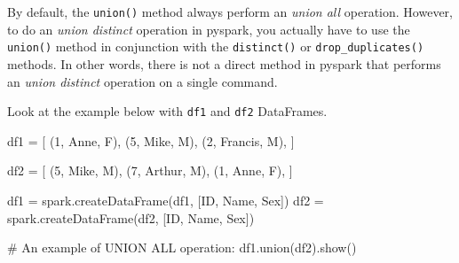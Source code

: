 \documentclass[
  11pt,
  letterpaper,
  DIV=11,
  numbers=noendperiod]{scrreprt}
\newenvironment{Shaded}{\begin{snugshade}}{\end{snugshade}}
\newcommand{\CommentTok}[1]{\textcolor[rgb]{0.37,0.37,0.37}{#1}}
\newcommand{\DecValTok}[1]{\textcolor[rgb]{0.68,0.00,0.00}{#1}}
\newcommand{\NormalTok}[1]{\textcolor[rgb]{0.00,0.23,0.31}{#1}}
\newcommand{\OperatorTok}[1]{\textcolor[rgb]{0.37,0.37,0.37}{#1}}
\newcommand{\StringTok}[1]{\textcolor[rgb]{0.13,0.47,0.30}{#1}}
\begin{document}
By default, the \texttt{union()} method always perform an \emph{union
all} operation. However, to do an \emph{union distinct} operation in
pyspark, you actually have to use the \texttt{union()} method in
conjunction with the \texttt{distinct()} or \texttt{drop\_duplicates()}
methods. In other words, there is not a direct method in pyspark that
performs an \emph{union distinct} operation on a single command.

Look at the example below with \texttt{df1} and \texttt{df2} DataFrames.

\begin{Shaded}
\begin{Highlighting}[]
\NormalTok{df1 }\OperatorTok{=}\NormalTok{ [}
\NormalTok{    (}\DecValTok{1}\NormalTok{, }\StringTok{\textquotesingle{}Anne\textquotesingle{}}\NormalTok{, }\StringTok{\textquotesingle{}F\textquotesingle{}}\NormalTok{),}
\NormalTok{    (}\DecValTok{5}\NormalTok{, }\StringTok{\textquotesingle{}Mike\textquotesingle{}}\NormalTok{, }\StringTok{\textquotesingle{}M\textquotesingle{}}\NormalTok{),}
\NormalTok{    (}\DecValTok{2}\NormalTok{, }\StringTok{\textquotesingle{}Francis\textquotesingle{}}\NormalTok{, }\StringTok{\textquotesingle{}M\textquotesingle{}}\NormalTok{),}
\NormalTok{]}

\NormalTok{df2 }\OperatorTok{=}\NormalTok{ [}
\NormalTok{    (}\DecValTok{5}\NormalTok{, }\StringTok{\textquotesingle{}Mike\textquotesingle{}}\NormalTok{, }\StringTok{\textquotesingle{}M\textquotesingle{}}\NormalTok{),}
\NormalTok{    (}\DecValTok{7}\NormalTok{, }\StringTok{\textquotesingle{}Arthur\textquotesingle{}}\NormalTok{, }\StringTok{\textquotesingle{}M\textquotesingle{}}\NormalTok{),}
\NormalTok{    (}\DecValTok{1}\NormalTok{, }\StringTok{\textquotesingle{}Anne\textquotesingle{}}\NormalTok{, }\StringTok{\textquotesingle{}F\textquotesingle{}}\NormalTok{),}
\NormalTok{]}

\NormalTok{df1 }\OperatorTok{=}\NormalTok{ spark.createDataFrame(df1, [}\StringTok{\textquotesingle{}ID\textquotesingle{}}\NormalTok{, }\StringTok{\textquotesingle{}Name\textquotesingle{}}\NormalTok{, }\StringTok{\textquotesingle{}Sex\textquotesingle{}}\NormalTok{])}
\NormalTok{df2 }\OperatorTok{=}\NormalTok{ spark.createDataFrame(df2, [}\StringTok{\textquotesingle{}ID\textquotesingle{}}\NormalTok{, }\StringTok{\textquotesingle{}Name\textquotesingle{}}\NormalTok{, }\StringTok{\textquotesingle{}Sex\textquotesingle{}}\NormalTok{])}

\CommentTok{\# An example of UNION ALL operation:}
\NormalTok{df1.union(df2).show()}
\end{Highlighting}
\end{Shaded}
\end{document}
